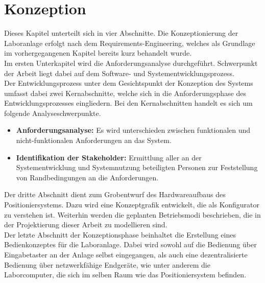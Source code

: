 \documentclass[../../Bachelorarbeit.tex]{subfiles}
\begin{document}
\section{Konzeption}
Dieses Kapitel unterteilt sich in vier Abschnitte. Die Konzeptionierung der Laboranlage erfolgt nach dem Requirements-Engineering, welches als Grundlage im vorhergegangenen Kapitel bereits kurz behandelt wurde.\\
Im ersten Unterkapitel wird die Anforderungsanalyse durchgeführt. Schwerpunkt der Arbeit liegt dabei auf dem Software- und Systementwicklungsprozess.\\
Der Entwicklungsprozess unter dem Gesichtspunkt der Konzeption des Systems umfasst dabei zwei Kernabschnitte, welche sich in die Anforderungsphase des Entwicklungsprozesses eingliedern. Bei den Kernabschnitten handelt es sich um folgende Analyseschwerpunkte.\\
\begin{itemize}
    \item \textbf{Anforderungsanalyse:} Es wird unterschieden zwischen funktionalen und nicht-funktionalen Anforderungen an das System.
    \item \textbf{Identifikation der Stakeholder:} Ermittlung aller an der Systementwicklung und Systemnutzung beteiligten Personen zur Feststellung von Randbedingungen an die Anforderungen.
\end{itemize}

Der dritte Abschnitt dient zum Grobentwurf des Hardwareaufbaus des Positioniersystems. Dazu wird eine Konzeptgrafik entwickelt, die als Konfigurator zu verstehen ist. Weiterhin werden die geplanten Betriebsmodi beschrieben, die in der Projektierung dieser Arbeit zu modellieren sind.\\
Der letzte Abschnitt der Konzeptionsphase beinhaltet die Erstellung eines Bedienkonzeptes für die Laboranlage. Dabei wird sowohl auf die Bedienung über Eingabetaster an der Anlage selbst eingegangen, als auch eine dezentralisierte Bedienung über netzwerkfähige Endgeräte, wie unter anderem die Laborcomputer, die sich im selben Raum wie das Positioniersystem befinden.
\end{document}
